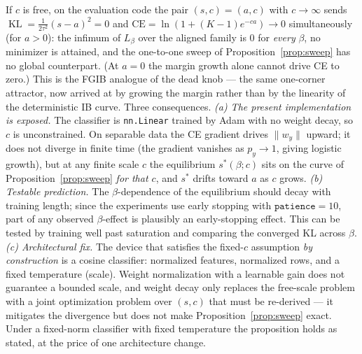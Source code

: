 \begin{remark}\label{rem:c-scale}
If $c$ is free, on the evaluation code the pair $(s, c) = (a, c)$ with $c \to \infty$
sends
$\operatorname{KL} = \tfrac{1}{2\tau^2}(s-a)^2 = 0$ and
$\mathrm{CE} = \ln(1 + (K-1)e^{-ca}) \to 0$ simultaneously (for $a > 0$): the infimum
of $L_\beta$ over the aligned family is $0$ for \emph{every} $\beta$, no minimizer is
attained, and the one-to-one sweep of Proposition~\ref{prop:sweep} has no global
counterpart. (At $a = 0$ the margin growth alone cannot drive CE to zero.) This is
the FGIB analogue of the dead knob --- the same one-corner attractor, now arrived at by
growing the margin rather than by the linearity of the deterministic IB curve.
Three consequences.
\emph{(a) The present implementation is exposed.} The classifier is
\texttt{nn.Linear} trained by Adam with no weight decay, so $c$ is unconstrained. On
separable data the CE gradient drives $\|w_y\|$ upward; it does not diverge in finite
time (the gradient vanishes as $p_y \to 1$, giving logistic growth), but at any finite
scale $c$ the equilibrium $s^*(\beta; c)$ sits on the curve of
Proposition~\ref{prop:sweep} \emph{for that $c$}, and $s^*$ drifts toward $a$ as $c$
grows.
\emph{(b) Testable prediction.} The $\beta$-dependence of the equilibrium should decay
with training length; since the experiments use early stopping with $\texttt{patience} =
10$, part of any observed $\beta$-effect is plausibly an early-stopping effect. This can
be tested by training well past saturation and comparing the converged KL across
$\beta$.
\emph{(c) Architectural fix.} The device that satisfies the fixed-$c$ assumption
\emph{by construction} is a cosine classifier: normalized features, normalized rows,
and a fixed temperature (scale). Weight normalization with a learnable gain does not
guarantee a bounded scale, and weight decay only replaces the free-scale problem with a
joint optimization problem over $(s, c)$ that must be re-derived --- it mitigates the
divergence but does not make Proposition~\ref{prop:sweep} exact. Under a fixed-norm
classifier with fixed temperature the proposition holds as stated, at the price of one
architecture change.
\end{remark}

